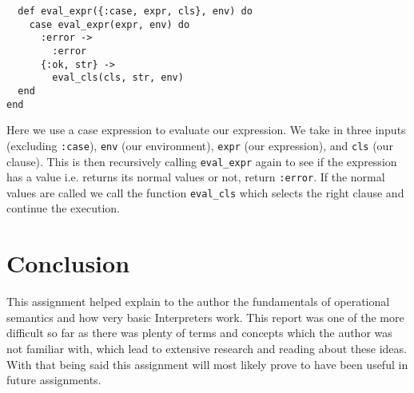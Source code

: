 \documentclass[a4paper,11pt]{article}
\begin{document}
\begin{verbatim}
  def eval_expr({:case, expr, cls}, env) do
    case eval_expr(expr, env) do
      :error ->
        :error
      {:ok, str} ->
        eval_cls(cls, str, env)
  end
end
\end{verbatim}

Here we use a case expression to evaluate our expression. We take in three inputs (excluding {\tt :case}), {\tt env} (our environment), {\tt expr} (our expression), and {\tt cls} (our clause). This is then recursively calling {\tt eval\_expr} again to see if the expression has a value i.e. returns its normal values or not, return {\tt :error}. If the normal values are called we call the function {\tt eval\_cls} which selects the right clause and continue the execution.

\section*{Conclusion}
This assignment helped explain to the author the fundamentals of operational semantics and how very basic Interpreters work. This report was one of the more difficult so far as there was plenty of terms and concepts which the author was not familiar with, which lead to extensive research and reading about these ideas. With that being said this assignment will most likely prove to have been useful in future assignments.
\end{document}
